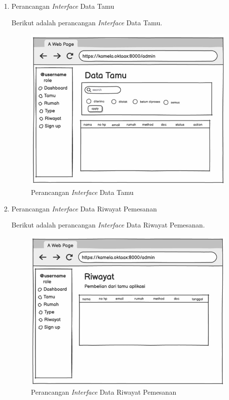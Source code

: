 \begin{enumerate}
        \item Perancangan \textit{Interface} Data Tamu
        \par Berikut adalah perancangan \textit{Interface} Data Tamu.
        \begin{figure}
            \centering
            \includegraphics[width=0.75\linewidth]{Wireframe/Data Tamu.png}
            \caption{Perancangan \textit{Interface} Data Tamu}
        \end{figure}
        
        \item Perancangan \textit{Interface} Data Riwayat Pemesanan
        \par Berikut adalah perancangan \textit{Interface} Data Riwayat Pemesanan.
        \begin{figure}
            \centering
            \includegraphics[width=0.75\linewidth]{Wireframe/Riwayat Pemesanan.png}
            \caption{Perancangan \textit{Interface} Data Riwayat Pemesanan}
        \end{figure}
        

\end{enumerate}
